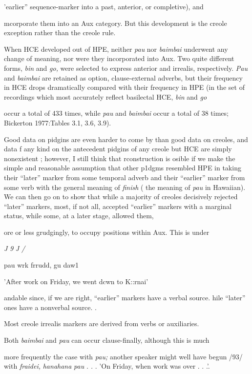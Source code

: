 'earlier'' sequence-marker into a past, anterior, or completive), and

mcorporate them into an Aux category. But this development is the creole exception rather than the creole rule.

When HCE developed out of HPE, neither \textit{pau} nor \textit{baimbai} underwent any change of meaning, nor were they incorporated into Aux. Two quite different forms, \textit{bin }and \textit{go,} were selected to express anterior and irrealis, respectively. \textit{Pau} and \textit{baimbai} are retained as option, clause-external adverbs, but their frequency in HCE drops dramatically compared with their frequency in HPE (in the set of recordings which most accurately reflect basilectal HCE, \textit{bin} and \textit{go}

occur a total of 433 times, while \textit{pau }and \textit{baimbai} occur a total of 38 times; Bickerton 1977:Tables 3.1, 3.6, 3.9).

Good data on pidgins are even harder to come by than good data on creoles, and data f any kind on the antecedent pidgins of any creole but HCE are simply nonexistent ; however, I still think that rconstruction is osible if we make the simple and reasonable assump\-tion that other p1dgms resembled HPE in taking their ``later'' marker from some temporal adverb and their ``earlier'' marker from some verb with the general meaning of \textit{finish }( the meaning of \textit{pau} in Hawaiian). We can then go on to show that while a majority of creoles decisively rejected ``later'' markers, most, if not all, accepted ``earlier'' markers with a marginal status, while some, at a later stage, allowed them,

ore or less grudgingly, to occupy positions within Aux. This is under\-

\textit{J} \textit{9} \textit{J} \textit{/}

pau wrk frrudd, gu daw1

'After work on Friday, we went dcwn to K::rnai'

andable since, if we are right, ``earlier'' markers have a verbal source. hile ``later'' ones have a nonverbal source. .

Most creole irrealis markers are derived from verbs or auxiliaries.

Both \textit{baimbai }and \textit{pau }can occur clause-finally, although this is much

more frequently the case with \textit{pau;} another speaker might well have begun /93/ with \textit{fraidei,} \textit{hanahana} \textit{pau} \textit{.} \textit{.} . 'On Friday, when work was over . . .'.


